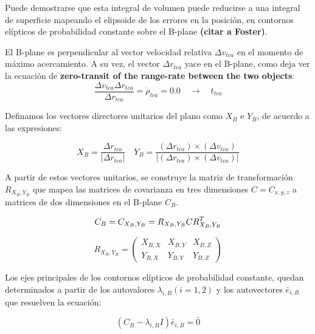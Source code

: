 Puede demostrarse que esta integral de volumen puede reducirse a una integral de superficie mapeando el elipsoide  de los errores en la posici\'on, en contornos el\'ipticos de probabilidad constante sobre el B-plane {\bf{(citar a Foster)}}.

El B-plane es perpendicular al vector velocidad relativa $\Delta v_{tca}$ en el momento de m\'aximo acercamiento.
A su vez, el vector $\Delta r_{tca}$ yace en el B-plane, como deja ver la ecuaci\'on de {\bf{zero-transit of the range-rate between the two objects}}:
\begin{equation}
 \frac{\Delta v_{tca} \Delta r_{tca}}{\Delta r_{tca}}= \dot{\rho}_{tca}=0.0 \quad \rightarrow \quad t_{tca}
\end{equation}

Definamos los vectores directores unitarios del plano como $X_{B}$ e $Y_{B}$, de acuerdo a las expresiones:

\begin{equation}
 X_{B}=\frac{\Delta r_{tca}}{|\Delta r_{tca}|} \quad Y_{B}=\frac{(\Delta r_{tca}) \times (\Delta v_{tca})}{|(\Delta r_{tca}) \times (\Delta v_{tca})|}
\end{equation}


A partir de estos vectores unitarios, se construye la matriz de transformaci\'on $R_{X_{B},Y_{B}}$ que mapea las matrices de covarianza en tres dimensiones $C=C_{x,y,z}$ a matrices de dos dimensiones en el B-plane $C_{B}$.

\begin{equation}
  C_{B} = C_{{X_{B},Y_{B}}} = R_{X_{B},Y_{B}} C R^{T}_{X_{B},Y_{B}}\\
\end{equation}

\begin{equation}
  R_{X_{B},Y_{B}} = 
  \begin{pmatrix}
    X_{B,X} & X_{B,Y} & X_{B,Z}\\
    Y_{B,X} & Y_{B,Y} & Y_{B,Z}
  \end{pmatrix}
\end{equation}

Los ejes principales de los contornos el\'ipticos de probabilidad constante, quedan determinados a partir de los autovalores $\lambda_{i,B}(i=1,2)$ y los autovectores $\bar{e}_{i,B}$ que resuelven la ecuaci\'on:

\begin{equation}
(C_{B} - \lambda_{i,B} I) \bar{e}_{i,B} = \bar{0}
\end{equation}

